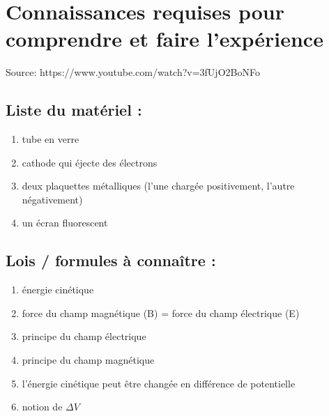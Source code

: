 \documentclass[../main.tex]{subfiles}
\begin{document}
\section{Connaissances requises pour comprendre et faire l'expérience}
Source:  https://www.youtube.com/watch?v=3fUjO2BoNFo
\subsection{Liste du matériel :}
\begin{enumerate}
    \item tube en verre
    \item cathode qui éjecte des électrons
    \item deux plaquettes métalliques (l'une chargée positivement, l'autre négativement)
    \item un écran fluorescent
\end{enumerate}
\subsection{Lois / formules à connaître : }
\begin{enumerate}
    \item énergie cinétique
    \item force du champ magnétique (B) = force du champ électrique (E)
    \item principe du champ électrique
    \item principe du champ magnétique
    \item l'énergie cinétique peut être changée en différence de potentielle
    \item notion de $\Delta V$
\end{enumerate}
\end{document}
